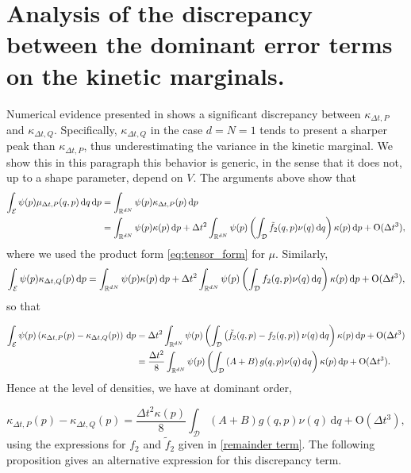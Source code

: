\section{Analysis of the discrepancy between the dominant error terms on the kinetic marginals.}\label{discrepancy term kinetic}
Numerical evidence presented in \cite{KK22} shows a significant discrepancy between $\kappa_{\Delta t,P}$ and $\kappa_{\Delta t,Q}$.
Specifically, $\kappa_{\Delta t,Q}$ in the case $d=N=1$ tends to present a sharper peak than $\kappa_{\Delta t,P}$, thus underestimating the variance in the kinetic marginal.
 We show this in this paragraph this behavior is generic, in the sense that it does not, up to a shape parameter, depend on $V$.
The arguments above show that
\begin{equation}
  \begin{aligned}
    \int_{\mathcal E}\psi(p)\mu_{\Delta t,P}(q,p)\,\mathrm{d}q\,\mathrm{d}p&=\int_{\mathbb{R}^{dN}}\psi(p)\kappa_{\Delta t,P}(p)\,\mathrm{d}p\\
    &=\int_{\mathbb{R}^{dN}}\psi(p)\kappa(p)\,\mathrm{d}p+\Delta t^2\int_{\mathbb{R}^{dN}}\psi(p)\left(\int_{\mathcal D} \tilde f_2(q,p)\nu(q)\,\mathrm{d}q\right)\kappa(p)\,\mathrm{d}p +\mathrm{O}(\Delta t^3),  
  \end{aligned}
\end{equation}
where we used the product form \eqref{eq:tensor_form} for $\mu$. Similarly,
\begin{equation}
  \int_{\mathcal E}\psi(p)\kappa_{\Delta t,Q}(p)\,\mathrm{d}p=\int_{\mathbb{R}^{dN}}\psi(p)\kappa(p)\,\mathrm{d}p+\Delta t^2\int_{\mathbb{R}^{dN}}\psi(p)\left(\int_{\mathcal D}f_2(q,p)\nu(q)\,\mathrm{d}q\right)\kappa(p)\,\mathrm{d}p +\mathrm{O}(\Delta t^3),
\end{equation}
so that 

\begin{align*}
  \int_{\mathcal E}\psi(p)\left(\kappa_{\Delta t,P}(p)-\kappa_{\Delta t,Q}(p)\right)\,\mathrm{d}p&=\Delta t^2\int_{\mathbb{R}^{dN}}\psi(p)\left(\int_{\mathcal D}\left(\tilde f_2(q,p)-f_2(q,p)\right)\nu(q)\,\mathrm{d}q\right)\kappa(p)\,\mathrm{d}p +\mathrm{O}(\Delta t^3)\\
  &=\frac{\Delta t^2}8\int_{\mathbb{R}^{dN}}\psi(p)\left(\int_{\mathcal D}\left(A+B\right)g(q,p)\nu(q)\,\mathrm{d}q\right)\kappa(p)\,\mathrm{d}p +\mathrm{O}(\Delta t^3).
\end{align*}
Hence at the level of densities, we have at dominant order,

$$ \kappa_{\Delta t,P}(p)- \kappa_{\Delta t,Q}(p)=\frac{\Delta t^2\kappa(p)}8\int_{\mathcal D}\left(A+B\right)g(q,p)\nu(q)\,\mathrm{d}q + \mathrm{O}(\Delta t^3),$$
using the expressions for $f_2$ and $\tilde f_2$ given in \eqref{remainder term}. The following proposition gives an alternative expression for this discrepancy term.

